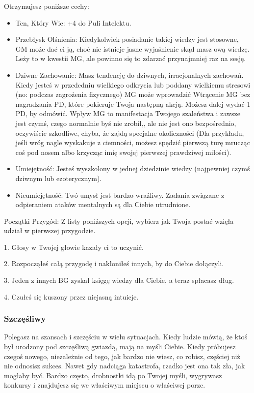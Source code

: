Otrzymujesz poniższe cechy:
\begin{itemize}
    \item Ten, Który Wie: +4 do Puli Intelektu.
    \item Przebłysk Olśnienia: Kiedykolwiek posiadanie takiej wiedzy jest stosowne, GM może dać ci ją, choć nie istnieje jasne wyjaśnienie skąd masz ową wiedzę. Leży to w kwestii MG, ale powinno się to zdarzać przynajmniej raz na sesję.
    \item  Dziwne Zachowanie: Masz tendencję do dziwnych, irracjonalnych zachowań. Kiedy jesteś w przededniu wielkiego odkrycia lub poddany wielkiemu stresowi (no: podczas zagrożenia fizycznego) MG może wprowadzić Wtrącenie MG bez nagradzania PD, które pokieruje Twoja następną akcją. Możesz dalej wydać 1 PD, by odmówić. Wpływ MG to manifestacja Twojego szaleństwa i zawsze jest czymś, czego normalnie byś nie zrobił,, ale nie jest ono bezpośrednio, oczywiście szkodliwe, chyba, że zajdą specjalne okoliczności (Dla przykładu, jeśli wróg nagle wyskakuje z ciemności, możesz spędzić pierwszą turę mrucząc coś pod nosem albo krzycząc imię swojej pierwszej prawdziwej miłości). 
    \item  Umiejętność: Jesteś wyszkolony w jednej dziedzinie wiedzy (najpewniej czymś dziwnym lub ezoterycznym).
    \item  Nieumiejętność: Twó umysł jest bardzo wrażliwy. Zadania związane z odpieraniem ataków mentalnych są dla Ciebie utrudnione.
\end{itemize}

Początki Przygód: Z listy poniższych opcji, wybierz jak Twoja postać wzięła udział w pierwszej przygodzie.

1. Głosy w Twojej głowie kazały ci to uczynić.

2. Rozpocząłeś całą przygodę i nakłoniłeś innych, by do Ciebie dołączyli.

3. Jeden z innych BG zyskał księgę wiedzy dla Ciebie, a teraz spłacasz dług.

4. Czułeś się kuszony przez niejasną intuicje.

\subsubsection{Szczęśliwy}

Polegasz na szansach i szczęściu w wielu sytuacjach. Kiedy ludzie mówią, że ktoś był urodzony pod szczęśliwą gwiazdą, mają na myśli Ciebie. Kiedy próbujesz czegoś nowego, niezależnie od tego, jak bardzo nie wiesz, co robisz, częściej niż nie odnosisz sukces. Nawet gdy nadciąga katastrofa, rzadko jest ona tak zła, jak mogłaby być. Bardzo często, drobnostki idą po Twojej myśli, wygrywasz konkursy i znajdujesz się we właściwym miejscu o właściwej porze.

